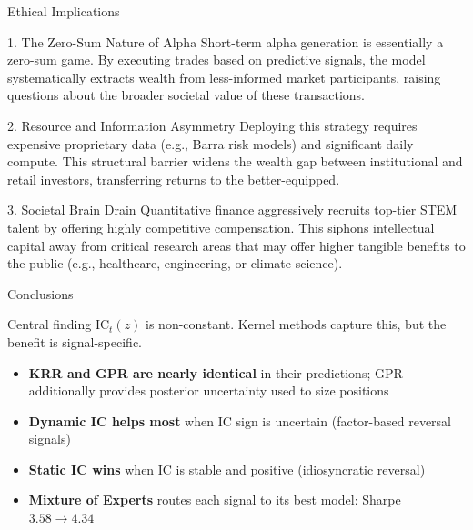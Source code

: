 \documentclass[aspectratio=169, 11pt]{beamer}
\newcommand{\IC}{\mathrm{IC}}
\begin{document}
\begin{frame}{Ethical Implications}
  \begin{block}{1. The Zero-Sum Nature of Alpha}
    Short-term alpha generation is essentially a zero-sum game. By executing trades based on predictive signals, the model systematically extracts wealth from less-informed market participants, raising questions about the broader societal value of these transactions.
  \end{block}

  \begin{block}{2. Resource and Information Asymmetry}
    Deploying this strategy requires expensive proprietary data (e.g., Barra risk models) and significant daily compute. This structural barrier widens the wealth gap between institutional and retail investors, transferring returns to the better-equipped.
  \end{block}

  \begin{block}{3. Societal Brain Drain}
    Quantitative finance aggressively recruits top-tier STEM talent by offering highly competitive compensation. This siphons intellectual capital away from critical research areas that may offer higher tangible benefits to the public (e.g., healthcare, engineering, or climate science).
  \end{block}
\end{frame}

\begin{frame}{Conclusions}
  \begin{block}{Central finding}
    $\IC_t(z)$ is non-constant. Kernel methods capture this, but the benefit is signal-specific.
  \end{block}

  \bigskip
  \begin{itemize}
    \item \textbf{KRR and GPR are nearly identical} in their predictions; GPR additionally
          provides posterior uncertainty used to size positions
    \item \textbf{Dynamic IC helps most} when IC sign is uncertain (factor-based reversal signals)
    \item \textbf{Static IC wins} when IC is stable and positive (idiosyncratic reversal)
    \item \textbf{Mixture of Experts} routes each signal to its best model: Sharpe $3.58 \to 4.34$
  \end{itemize}
\end{frame}
\end{document}
